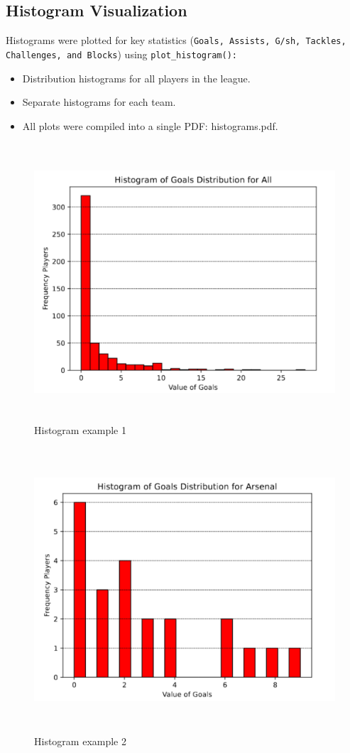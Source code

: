 \documentclass[12pt,a4paper]{report}
\begin{document}
\subsection{Histogram Visualization}
Histograms were plotted for key statistics (\texttt{Goals, Assists, G/sh, Tackles, Challenges, and Blocks}) using \texttt{plot\_histogram():}
\begin{itemize}
    \item Distribution histograms for all players in the league.
    \item Separate histograms for each team.
    \item All plots were compiled into a single PDF: histograms.pdf.
\end{itemize}

\begin{figure}[H]
    \centering
    \includegraphics[width=5.557292213473316in,height=4.061097987751531in]{media/image9.png}
    \caption{Histogram example 1}
\end{figure}

\begin{figure}[H]
    \centering
    \includegraphics[width=5.755208880139983in,height=4.168293963254593in]{media/image11.png}
    \caption{Histogram example 2}
\end{figure}
\end{document}

